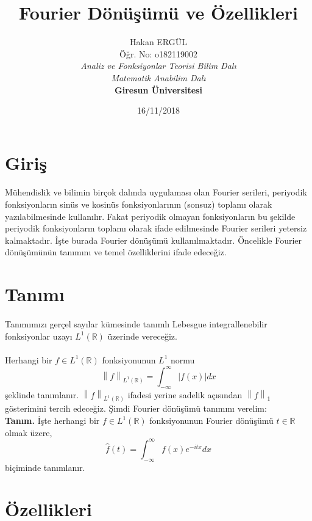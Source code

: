 \documentclass[a4paper, 9pt]{article}
\title{Fourier Dönüşümü ve Özellikleri}
\author{Hakan ERGÜL\\
Öğr. No: o182119002 \\
\textit{Analiz ve Fonksiyonlar Teorisi Bilim Dalı}\\
\textit{Matematik Anabilim Dalı}\\
\textbf{Giresun Üniversitesi}}
\date{16/11/2018}
\begin{document}
\maketitle

\section{Giriş}

\paragraph{}
Mühendislik ve bilimin birçok dalında uygulaması olan Fourier serileri, periyodik fonksiyonların sinüs ve kosinüs fonksiyonlarının (sonsuz) toplamı olarak yazılabilmesinde kullanılır. Fakat periyodik olmayan fonksiyonların bu şekilde periyodik fonksiyonların toplamı olarak ifade edilmesinde Fourier serileri yetersiz kalmaktadır. İşte burada Fourier dönüşümü kullanılmaktadır. Öncelikle Fourier dönüşümünün tanımını ve temel özelliklerini ifade edeceğiz.

\section{Tanımı}
\paragraph{}
Tanımımızı gerçel sayılar kümesinde tanımlı Lebesgue integrallenebilir fonksiyonlar uzayı $L^1(\mathbb{R})$ üzerinde vereceğiz.
\paragraph{}
Herhangi bir $f \in L^1(\mathbb{R})$ fonksiyonunun $L^1$ normu
\[\left \| f  \right \|_{ L^1(\mathbb{R})} = \int_{-\infty }^{\infty }\left | f(x) \right |dx\]
şeklinde tanımlanır. $ \left \| f  \right \|_{ L^1(\mathbb{R})}$  ifadesi yerine sadelik açısından $\left \| f  \right \|_1$ gösterimini tercih edeceğiz. Şimdi Fourier dönüşümü tanımını verelim:\\

\textbf{Tanım.} İşte herhangi bir $f \in L^1(\mathbb{R})$ fonksiyonunun Fourier dönüşümü $t\in \mathbb{R}$ olmak üzere,
\[  \widehat{f}(t)=\int_{-\infty }^{\infty }f(x)e^{-itx}dx  \]
biçiminde tanımlanır.

\section{Özellikleri}
\end{document}
